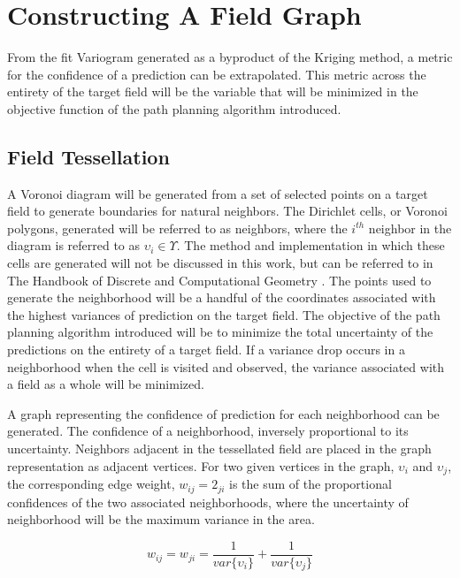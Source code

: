 \chapter{Constructing A Field Graph} \label{ch:graph_construction}
From the fit Variogram generated as a byproduct of the Kriging method, a metric for the confidence of a prediction can be extrapolated. This metric across the entirety of the target field will be the variable that will be minimized in the objective function of the path planning algorithm introduced.

\section{Field Tessellation}
A Voronoi diagram will be generated from a set of selected points on a target field to generate boundaries for natural neighbors. The Dirichlet cells, or Voronoi polygons, generated will be referred to as neighbors, where the $i^{th}$ neighbor in the diagram is referred to as $\upsilon_i \in \Upsilon$. The method and implementation in which these cells are generated will not be discussed in this work, but can be referred to in The Handbook of Discrete and Computational Geometry \cite{goodman:voronoi}. The points used to generate the neighborhood will be a handful of the coordinates associated with the highest variances of prediction on the target field. The objective of the path planning algorithm introduced will be to minimize the total uncertainty of the predictions on the entirety of a target field. If a variance drop occurs in a neighborhood when the cell is visited and observed, the variance associated with a field as a whole will be minimized.

A graph representing the confidence of prediction for each neighborhood can be generated. The confidence of a neighborhood, inversely proportional to its uncertainty. Neighbors adjacent in the tessellated field are placed in the graph representation as adjacent vertices. For two given vertices in the graph, $\upsilon_i$ and $\upsilon_j$, the corresponding edge weight, $w_{ij}=2_{ji}$ is the sum of the proportional confidences of the two associated neighborhoods, where the uncertainty of neighborhood will be the maximum variance in the area.

\begin{equation}
    w_{ij} = w_{ji} = \frac{1}{var\{\upsilon_i\}} + \frac{1}{var\{\upsilon_j\}}
\end{equation}

